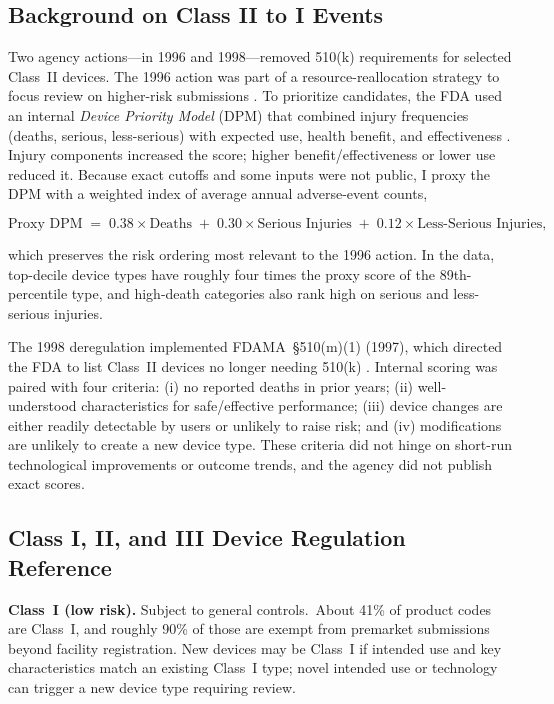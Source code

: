 \documentclass[letterpaper,12pt]{article}
\theoremstyle{definition}
\begin{document}
\subsection{Background on Class II to I Events}\label{sec:FDADecisionRule}

Two agency actions---in 1996 and 1998---removed 510(k) requirements for selected Class~II devices. The 1996 action was part of a resource-reallocation strategy to focus review on higher-risk submissions \citep{FR58:37378,FR60:38903}. To prioritize candidates, the FDA used an internal \emph{Device Priority Model} (DPM) that combined injury frequencies (deaths, serious, less-serious) with expected use, health benefit, and effectiveness \citep{FR60:38903}. Injury components increased the score; higher benefit/effectiveness or lower use reduced it. Because exact cutoffs and some inputs were not public, I proxy the DPM with a weighted index of average annual adverse-event counts,

\[
\text{Proxy DPM} \;=\; 0.38 \times \text{Deaths} \;+\; 0.30 \times \text{Serious Injuries} \;+\; 0.12 \times \text{Less-Serious Injuries},
\]

which preserves the risk ordering most relevant to the 1996 action. In the data, top-decile device types have roughly four times the proxy score of the 89th-percentile type, and high-death categories also rank high on serious and less-serious injuries.



The 1998 deregulation implemented FDAMA~\S510(m)(1) (1997), which directed the FDA to list Class~II devices no longer needing 510(k) \citep{FR63:3142}. Internal scoring was paired with four criteria: (i) no reported deaths in prior years; (ii) well-understood characteristics for safe/effective performance; (iii) device changes are either readily detectable by users or unlikely to raise risk; and (iv) modifications are unlikely to create a new device type. These criteria did not hinge on short-run technological improvements or outcome trends, and the agency did not publish exact scores.



\subsection{Class I, II, and III Device Regulation Reference}\label{sec:MoreRegDetails}

\textbf{Class~I (low risk).} Subject to general controls.\footnotemark {}~About 41\% of product codes are Class~I, and roughly 90\% of those are exempt from premarket submissions beyond facility registration. New devices may be Class~I if intended use and key characteristics match an existing Class~I type; novel intended use or technology can trigger a new device type requiring review.\footnotemark {}
\end{document}
